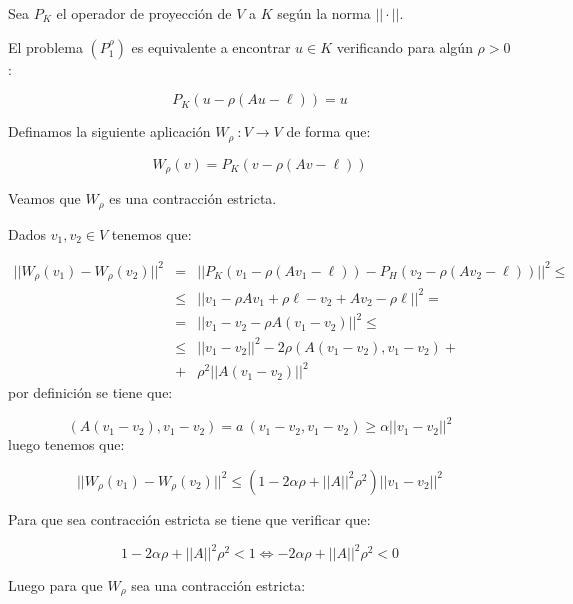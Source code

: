 \begin{demosteorema}
\begin{itemize}
Sea $P_K$ el operador de proyecci\'on de $V$ a $K$ seg\'un la norma
$||\cdot ||$.\newline

El problema $(P_1^{\rho})$ es equivalente a encontrar $u \in K$ verificando
para alg\'un $\rho > 0$:

\begin{displaymath} 
P_K(u-\rho (Au-\ell )) = u
\end{displaymath}

Definamos la siguiente aplicaci\'on $W_{\rho}\ :V \longrightarrow V$ de
forma que:

\begin{equation} \label{eq:wro}
W_{\rho} (v) = P_K(v-\rho (Av-\ell))
\end{equation}

Veamos que $W_{\rho}$ es una contracci\'on estricta.\newline

Dados $v_1,v_2 \in V$ tenemos que:

\begin{eqnarray*}
||W_{\rho}(v_1)-W_{\rho}(v_2)||^2 & = & ||P_K(v_1-\rho (Av_1-\ell ))-
P_H(v_2-\rho (Av_2-\ell )) ||^2 \le \\
& \le & || v_1 -\rho Av_1 + \rho \ell -v_2 + Av_2 - \rho \ell ||^2 = \\
& = & || v_1 - v_2 - \rho A(v_1-v_2)|| ^2 \le \\
& \le & || v_1 - v_2 ||^2 - 2\rho(A(v_1-v_2),v_1-v_2)+ \\
& + & \rho^2 ||A(v_1-v_2)||^2
\end{eqnarray*}
por definici\'on se tiene que:

\begin{displaymath}
(A(v_1-v_2),v_1-v_2) = a\ (v_1-v_2,v_1-v_2) \ge \alpha ||v_1-v_2 ||^2
\end{displaymath}
luego tenemos que:

\begin{displaymath}
||W_{\rho}(v_1)-W_{\rho}(v_2)||^2 \le (1-2\alpha \rho +||A||^2 \rho^2)
||v_1-v_2||^2
\end{displaymath}

Para que sea contracci\'on estricta se tiene que verificar que:

\begin{displaymath}
1-2\alpha \rho + ||A||^2 \rho^2 < 1 \Longleftrightarrow -2\alpha \rho +
||A||^2 \rho ^2 < 0
\end{displaymath}

Luego para que $W_{\rho}$ sea una contracci\'on estricta:


\end{itemize}
\end{demosteorema}

